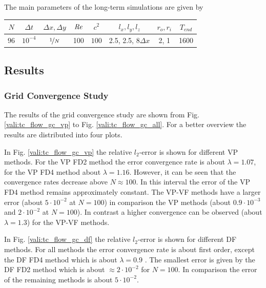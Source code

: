 The main parameters of the long-term simulations are  given by

\begin{center}
\vspace*{0.7ex}
\begin{tabular}{c|c|c|c|c|c|c|c }
 $ N  $                   & $\Delta t$ & $\Delta x, \Delta y$            & $\mbox{\textit{Re}}$  & $c^2$   & $l_x, l_y, l_z$ &$r_o, r_i$ & $T_{end}$\\
\hline
 $96 $& $10^{-4}$ & $\nicefrac{1}{N}$ & 100     & $100$   & 2.5, 2.5, 8$\Delta x$   & 2, 1& 1600\\
\end{tabular}
\vspace*{0.7ex}
\end{center}

\clearpage

\subsection{Results}

\subsubsection{Grid Convergence Study}


The results of the grid convergence study are shown from Fig. \ref{vali:tc_flow_gc_vp} to Fig. \ref{vali:tc_flow_gc_all}.
For a better overview the results are distributed into four plots.

In Fig. \ref{vali:tc_flow_gc_vp} the relative $l_2$-error is shown for different VP methods.
For the VP FD2 method the error convergence rate is about $\lambda=1.07$,
for the VP FD4 method about $\lambda=1.16$. However, it can be seen that the convergence rates decrease above $N\approx100$.
In this interval the error of the VP FD4 method remains approximately constant.
The VP-VF methods have a larger error (about $5\cdot 10^{-2}$ at $N=100$) in comparison the VP methods (about $0.9 \cdot 10^{-3}$ and  $2\cdot10^{-2}$ at $N=100$).
In contrast a higher convergence can be observed (about $\lambda=1.3$) for the VP-VF methods.

In Fig. \ref{vali:tc_flow_gc_df} the relative $l_2$-error is shown for different DF methods.
For all methods the error convergence rate is about first order, except the DF FD4 method which is about $\lambda=0.9$ .
The smallest error is given by the DF FD2 method which is about $\approx 2 \cdot 10^{-2}$ for $N=100$.
In comparison the error of the remaining methods is about $5\cdot10^{-2}$.

